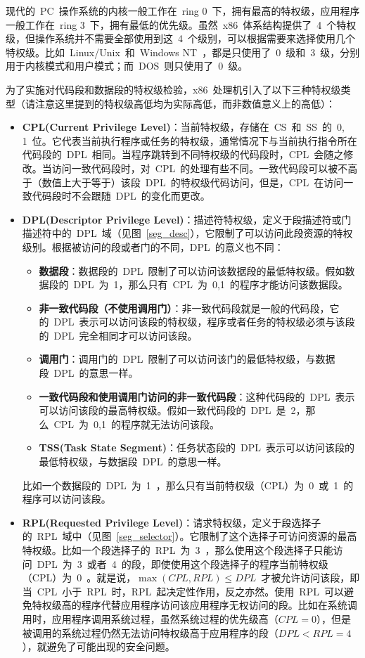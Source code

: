 现代的~PC~操作系统的内核一般工作在~ring 0~下，拥有最高的特权级，应用程序一般工作在~ring 3~下，拥有最低的优先级。虽然~x86~体系结构提供了~4~个特权级，但操作系统并不需要全部使用到这~4~个级别，可以根据需要来选择使用几个特权级。比如~Linux/Unix~和~Windows NT~，都是只使用了~0~级和~3~级，分别用于内核模式和用户模式；而~DOS~则只使用了~0~级。

为了实施对代码段和数据段的特权级检验，x86~处理机引入了以下三种特权级类型（请注意这里提到的特权级高低均为实际高低，而非数值意义上的高低）：

\begin{itemize}
\item{\textbf{CPL(Current Privilege Level)}}：当前特权级，存储在~CS~和~SS~的~0, 1~位。它代表当前执行程序或任务的特权级，通常情况下与当前执行指令所在代码段的~DPL~相同。当程序跳转到不同特权级的代码段时，CPL~会随之修改。当访问一致代码段时，对~CPL~的处理有些不同。一致代码段可以被不高于（数值上大于等于）该段~DPL~的特权级代码访问，但是，CPL~在访问一致代码段时不会跟随~DPL~的变化而更改。
\item{\textbf{DPL(Descriptor Privilege Level)}}：描述符特权级，定义于段描述符或门描述符中的~DPL~域（见图~\ref{seg_desc}），它限制了可以访问此段资源的特权级别。根据被访问的段或者门的不同，DPL~的意义也不同：
  \begin{itemize}
  \item{\textbf{数据段}}：数据段的~DPL~限制了可以访问该数据段的最低特权级。假如数据段的~DPL~为~1，那么只有~CPL~为~0,1~的程序才能访问该数据段。
  \item{\textbf{非一致代码段（不使用调用门）}}：非一致代码段就是一般的代码段，它的~DPL~表示可以访问该段的特权级，程序或者任务的特权级必须与该段的~DPL~完全相同才可以访问该段。
  \item{\textbf{调用门}}：调用门的~DPL~限制了可以访问该门的最低特权级，与数据段~DPL~的意思一样。
  \item{\textbf{一致代码段和使用调用门访问的非一致代码段}}：这种代码段的~DPL~表示可以访问该段的最高特权级。假如一致代码段的~DPL~是~2，那么~CPL~为~0,1~的程序就无法访问该段。
  \item{\textbf{TSS(Task State Segment)}}：任务状态段的~DPL~表示可以访问该段的最低特权级，与数据段~DPL~的意思一样。
  \end{itemize}
比如一个数据段的~DPL~为~1~，那么只有当前特权级（CPL）为~0~或~1~的程序可以访问该段。
\item{\textbf{RPL(Requested Privilege Level)}}：请求特权级，定义于段选择子的~RPL~域中（见图~\ref{seg_selector}）。它限制了这个选择子可访问资源的最高特权级。比如一个段选择子的~RPL~为~3~，那么使用这个段选择子只能访问~DPL~为~3~或者~4~的段，即使使用这个段选择子的程序当前特权级（CPL）为~0~。就是说，$\max{(CPL, RPL)}\le DPL$~才被允许访问该段，即当~CPL~小于~RPL~时，RPL~起决定性作用，反之亦然。使用~RPL~可以避免特权级高的程序代替应用程序访问该应用程序无权访问的段。比如在系统调用时，应用程序调用系统过程，虽然系统过程的优先级高（$CPL=0$），但是被调用的系统过程仍然无法访问特权级高于应用程序的段（$DPL<RPL=4$），就避免了可能出现的安全问题。
\end{itemize}

